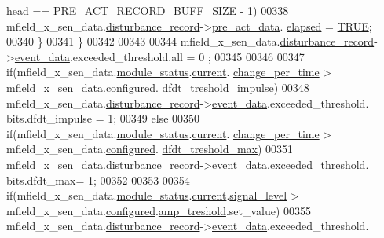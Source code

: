 \begin{DoxyCode}
      \hyperlink{a00022_a15a6827ccabba1c22396eccc1c5c654b}{head} == \hyperlink{a00022_a18dcecc16ded13fa622e0913e73442e6}{PRE\_ACT\_RECORD\_BUFF\_SIZE} - 1)
00338     mfield\_x\_sen\_data.\hyperlink{a00025_ac9b38e2c1d3f1013a88d33506c754152}{disturbance\_record}->\hyperlink{a00028_aab01e8da056827bc5c9caff9b64c78be}{pre\_act\_data}.
      \hyperlink{a00022_abecaedb3605e8bca8335cd81ca63025f}{elapsed} = \hyperlink{a00040_aa8cecfc5c5c054d2875c03e77b7be15d}{TRUE};
00340     \}
00341     \}
00342 
00343 
00344     mfield\_x\_sen\_data.\hyperlink{a00025_ac9b38e2c1d3f1013a88d33506c754152}{disturbance\_record}->\hyperlink{a00028_a8c0bda69e71ef674e60da47ad0be9ab0}{event\_data}.exceeded\_threshold.all = 0
      ;
00345 
00346 
00347     \textcolor{keywordflow}{if}(mfield\_x\_sen\_data.\hyperlink{a00025_adfab5a5d8b45a93dfb13edb24e2b80e3}{module\_status}.\hyperlink{a00019_acf41ffc11da291c2f9f0fcb02ee72b98}{current}.
      \hyperlink{a00019_a0f645dd76b41adc6a966feba8e4bff8c}{change\_per\_time} > mfield\_x\_sen\_data.\hyperlink{a00025_a94b2d1f6ea4ab334c74d24984dd27843}{configured}.
      \hyperlink{a00021_a3b9c683370c94430a4c6a9d78ce6f5ef}{dfdt\_treshold\_impulse})
00348         mfield\_x\_sen\_data.\hyperlink{a00025_ac9b38e2c1d3f1013a88d33506c754152}{disturbance\_record}->\hyperlink{a00028_a8c0bda69e71ef674e60da47ad0be9ab0}{event\_data}.exceeded\_threshold.
      bits.dfdt\_impulse = 1;
00349     \textcolor{keywordflow}{else}
00350     \textcolor{keywordflow}{if}(mfield\_x\_sen\_data.\hyperlink{a00025_adfab5a5d8b45a93dfb13edb24e2b80e3}{module\_status}.\hyperlink{a00019_acf41ffc11da291c2f9f0fcb02ee72b98}{current}.
      \hyperlink{a00019_a0f645dd76b41adc6a966feba8e4bff8c}{change\_per\_time}  > mfield\_x\_sen\_data.\hyperlink{a00025_a94b2d1f6ea4ab334c74d24984dd27843}{configured}.
      \hyperlink{a00021_adf9a37828e447378b1d533185213316d}{dfdt\_treshold\_max})
00351          mfield\_x\_sen\_data.\hyperlink{a00025_ac9b38e2c1d3f1013a88d33506c754152}{disturbance\_record}->\hyperlink{a00028_a8c0bda69e71ef674e60da47ad0be9ab0}{event\_data}.exceeded\_threshold.
      bits.dfdt\_max= 1;
00352 
00353 
00354     \textcolor{keywordflow}{if}(mfield\_x\_sen\_data.\hyperlink{a00025_adfab5a5d8b45a93dfb13edb24e2b80e3}{module\_status}.\hyperlink{a00019_acf41ffc11da291c2f9f0fcb02ee72b98}{current}.\hyperlink{a00019_a4070db8eab0ff93e3fbc1df59872f117}{signal\_level} > 
      mfield\_x\_sen\_data.\hyperlink{a00025_a94b2d1f6ea4ab334c74d24984dd27843}{configured}.\hyperlink{a00021_a4b3bbfb0267daea1432f2603825ade62}{amp\_treshold}.set\_value)
00355         mfield\_x\_sen\_data.\hyperlink{a00025_ac9b38e2c1d3f1013a88d33506c754152}{disturbance\_record}->\hyperlink{a00028_a8c0bda69e71ef674e60da47ad0be9ab0}{event\_data}.exceeded\_threshold.

\end{DoxyCode}
